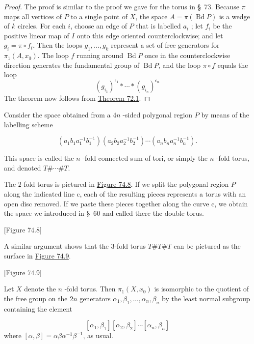 \begin{proof}
	The proof is similar to the proof we gave for the torus in \S\ 73. Because \(\pi\) maps all vertices of \(P\) to a single point of \(X\), the space \(A = \pi ( {\operatorname{Bd}P})\) is a wedge of \(k\) circles. For each \(i\), choose an edge of \(P\) that is labelled \(a_{i}\) ; let \(f_{i}\) be the positive linear map of \(I\) onto this edge oriented counterclockwise; and let \(g_{i} = \pi \circ {f}_{i}\). Then the loops \(g_{1},\ldots ,g_{k}\) represent a set of free generators for \({\pi }_{1}( {A,x_{0}})\). The loop \(f\) running around \(\operatorname{Bd}P\) once in the counterclockwise direction generates the fundamental group of \(\operatorname{Bd}P\), and the loop \(\pi \circ f\) equals the loop
\[
{( g_{i_{1}}) }^{{\epsilon }_{1}} * \cdots * {( g_{i_{n}}) }^{{\epsilon }_{n}}
\]
The theorem now follows from \hyperref[thm:72.1]{Theorem 72.1}.
\end{proof}
\begin{definition}
	Consider the space obtained from a \({4n}\) -sided polygonal region \(P\) by means of the labelling scheme

\[
( {a_{1}b_{1}a_1^{-1}b_1^{-1}}) ( {a_{2}b_{2}a_2^{-1}b_2^{-1}}) \cdots ( {a_{n}b_{n}a_n^{-1}b_n^{-1}}).
\]

This space is called the \(n\) -fold connected sum of tori, or simply the \(n\) -fold torus, and denoted \(T\# \cdots \# T\).
\end{definition}

The 2-fold torus is pictured in \hyperref[fig:74.8]{Figure 74.8}. If we split the polygonal region \(P\) along the indicated line c, each of the resulting pieces represents a torus with an open disc removed. If we paste these pieces together along the curve c, we obtain the space we introduced in \S\ 60 and called there the double torus.

[Figure 74.8]

A similar argument shows that the 3-fold torus \(T\# T\# T\) can be pictured as the surface in \hyperref[fig:74.9]{Figure 74.9}.

[Figure 74.9]
\begin{theorem}
\label{thm:\thetheorem}
	Let \(X\) denote the \(n\) -fold torus. Then \({\pi }_{1}( {X,x_{0}})\) is isomorphic to the quotient of the free group on the \({2n}\) generators \({\alpha }_{1},{\beta }_{1},\ldots ,{\alpha }_{n},{\beta }_{n}\) by the least normal subgroup containing the element

\[
[ {{\alpha }_{1},{\beta }_{1}}] [ {{\alpha }_{2},{\beta }_{2}}] \cdots [ {{\alpha }_{n},{\beta }_{n}}]
\]
where \([ {\alpha ,\beta }] = {\alpha \beta }{\alpha }^{-1}{\beta }^{-1}\), as usual.
\end{theorem}

